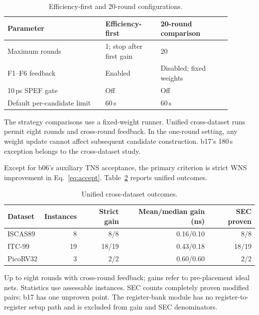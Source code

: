 \documentclass[preprint,12pt]{elsarticle}
\begin{document}
\begin{table}[htbp]\centering\small
\caption{Efficiency-first and 20-round configurations.}\label{tab:configs}
\begin{tabular}{p{0.39\linewidth}p{0.22\linewidth}p{0.28\linewidth}}\toprule
Parameter & Efficiency-first & 20-round comparison\\\midrule
Maximum rounds & 1; stop after first gain & 20\\
F1--F6 feedback & Enabled & Disabled; fixed weights\\
10\,ps SPEF gate & Off & Off\\
Default per-candidate limit & 60\,s & 60\,s\\\bottomrule
\end{tabular}
\par\smallskip\footnotesize The strategy comparisons use a fixed-weight runner. Unified cross-dataset runs permit eight rounds and cross-round feedback. In the one-round setting, any weight update cannot affect subsequent candidate construction. b17's 180\,s exception belongs to the cross-dataset study.
\end{table}

Except for b06's auxiliary TNS acceptance, the primary criterion is strict WNS improvement in Eq.~\eqref{eq:accept}. Table~\ref{tab:overview} reports unified outcomes.
\begin{table}[htbp]\centering\small
\caption{Unified cross-dataset outcomes.}\label{tab:overview}
\begin{tabular}{lrrrr}\toprule
Dataset & Instances & Strict gain & Mean/median gain (ns) & SEC proven\\\midrule
ISCAS89 & 8 & 8/8 & 0.16/0.10 & 8/8\\
ITC-99 & 19 & 18/19 & 0.43/0.18 & 18/19\\
PicoRV32 & 3 & 2/2 & 0.60/0.60 & 2/2\\\bottomrule
\end{tabular}
\par\smallskip\footnotesize Up to eight rounds with cross-round feedback; gains refer to pre-placement ideal nets. Statistics use assessable instances. SEC counts completely proven modified pairs; b17 has one unproven point. The register-bank module has no register-to-register setup path and is excluded from gain and SEC denominators.
\end{table}
\end{document}
